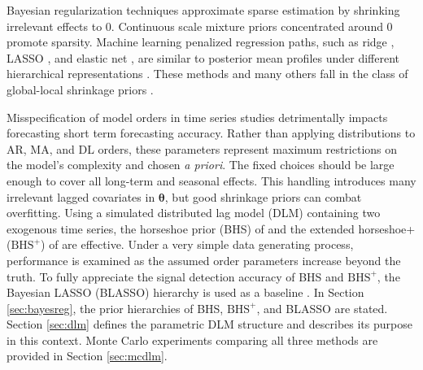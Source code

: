 Bayesian regularization techniques approximate sparse estimation by shrinking irrelevant effects to 0. Continuous scale mixture priors concentrated around 0 promote sparsity. Machine learning penalized regression paths, such as ridge \citep{Hoerl1970}, LASSO \citep{Tibshirani1996}, and elastic net \citep{Hastie2009a}, are similar to posterior mean profiles under different hierarchical representations \citep{Hsiang1975,Park2008,Li2010}. These methods and many others fall in the class of global-local shrinkage priors \citep{Polson2010}. 

Misspecification of model orders in time series studies detrimentally impacts forecasting short term forecasting accuracy. Rather than applying distributions to AR, MA, and DL orders, these parameters represent maximum  restrictions on the model's complexity and chosen \textit{a priori}. The fixed choices should be large enough to cover all long-term and seasonal effects. This handling introduces many irrelevant lagged covariates in $\bm{\theta}$, but good shrinkage priors can combat overfitting. Using a simulated distributed lag model (DLM) containing two exogenous time series, the horseshoe prior (BHS) of \citep{Carvalho2009,Carvalho2010} and the extended horseshoe+ ($\textrm{BHS}^+$) of \citep{Bhadra2016} are effective. Under a very simple data generating process, performance is examined as the assumed order parameters increase beyond the truth. To fully appreciate the signal detection accuracy of BHS and $\textrm{BHS}^+$, the Bayesian LASSO (BLASSO) hierarchy is used as a baseline \citep{Park2008}. In Section \ref{sec:bayesreg}, the prior hierarchies of BHS, $\textrm{BHS}^+$, and BLASSO are stated. Section \ref{sec:dlm} defines the parametric DLM structure and describes its purpose in this context. Monte Carlo experiments comparing all three methods are provided in Section \ref{sec:mcdlm}.





\bigskip
